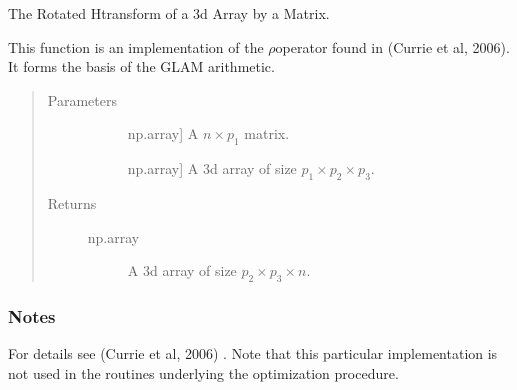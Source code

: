 \documentclass[letterpaper,10pt,english]{sphinxmanual}
\begin{document}
\begin{fulllineitems}
\label{\detokenize{pysmme:pysmme.transforms.H}}
\end{fulllineitems}


\begin{fulllineitems}
\label{\detokenize{pysmme:pysmme.transforms.RH}}
\sphinxAtStartPar
The Rotated H\sphinxhyphen{}transform of a 3d Array by a Matrix.

\sphinxAtStartPar
This function is an implementation of the \(\rho\)\sphinxhyphen{}operator found in
(Currie et al, 2006). It forms the basis of the GLAM arithmetic.
\begin{quote}\begin{description}
\item[{Parameters}] \leavevmode\begin{description}
\item[{}] \leavevmode{[}np.array{]}
\sphinxAtStartPar
A \(n \times p_1\) matrix.

\item[{}] \leavevmode{[}np.array{]}
\sphinxAtStartPar
A 3d array of size \(p_1 \times p_2 \times p_3\).

\end{description}

\item[{Returns}] \leavevmode\begin{description}
\item[{np.array}] \leavevmode
\sphinxAtStartPar
A 3d array of size \(p_2 \times p_3 \times n\).

\end{description}

\end{description}\end{quote}
\subsubsection*{Notes}

\sphinxAtStartPar
For details see (Currie et al, 2006) . Note that this particular implementation
is not used in the  routines underlying the optimization procedure.

\end{fulllineitems}
\end{document}
